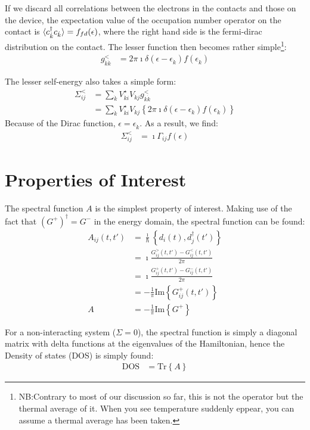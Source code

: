 If we discard all correlations between the electrons in the contacts and those on the device, the expectation value of the occupation number operator on the contact is $\braket{c_{\dot{k}}^\dagger c_{\dot{k}}}=f_{fd}(\epsilon)$, where the right hand side is the fermi-dirac distribution on the contact. The lesser function then becomes rather simple\footnote{NB:Contrary to most of our discussion so far, this is not the operator but the thermal average of it. When you see temperature suddenly eppear, you can assume a thermal average has been taken.}:
\begin{align*}
g^<_{\dot{k}\dot{k}} &= 2\pi\imath \delta(\epsilon-\epsilon_{\dot{k}}) f(\epsilon_{\dot{k}})
\end{align*}

The lesser self-energy also takes a simple form:
\begin{align*}
\Sigma^<_{ij} &= \sum_{\dot{k}} V_{\dot{k}i}^\star V_{\dot{k}j} g_{\dot{k}\dot{k}}^< \\&= \sum_{\dot{k}} V_{\dot{k}i}^\star V_{\dot{k}j} \left\{2\pi\imath \delta(\epsilon-\epsilon_{\dot{k}}) f(\epsilon_{\dot{k}})\right\}
\end{align*}
Because of the Dirac function, $\epsilon=\epsilon_{\dot{k}}$. As a result, we find:
\begin{align*}
\Sigma^<_{ij} &= \imath \Gamma_{ij} f(\epsilon)
\end{align*}
\section{Properties of Interest}
\label{sec:properties}
The spectral function $A$ is the simplest property of interest. Making use of the fact that $\left(G^+\right)^\dagger = G^-$ in the energy domain, the spectral function can be found:
\begin{align*}
A_{ij}(t, t') &= \frac{\imath}{\hbar} \left\{ d_i(t), d_j^\dagger(t')\right\} \\
&= \imath \frac{ G^>_{ij}(t, t') - G^<_{ij}(t, t')}{2\pi} \\
&= \imath \frac{G^+_{ij}(t, t') - G^-_{ij}(t, t')}{2\pi}\\
&= - \frac{1}{\pi} \text{Im}\left\{ G^+_{ij}(t, t')\right\} \\
A &=- \frac{1}{\pi} \text{Im}\left\{ G^+\right\}
\end{align*}

For a non-interacting system ($\Sigma=0$), the spectral function is simply a diagonal matrix with delta functions at the eigenvalues of the Hamiltonian, hence the Density of states (DOS) is simply found:
\begin{align}
\text{DOS} &= \text{Tr}\left\{A\right\}
\label{eq:dos}
\end{align}


